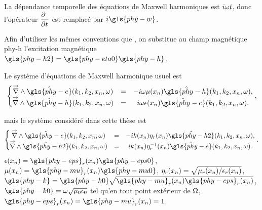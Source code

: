 

La dépendance temporelle des équations de Maxwell harmoniques est \(i\w t\), donc l'opérateur \(\ddr{t}{~}\) est remplacé par \(i\gls{phy-w}\).

Afin d'utiliser les mêmes conventions que \cite{stupfel_implementation_2015}, on substitue au champ magnétique \gls{phy-h} l’excitation magnétique \(\gls{phy-h2} = \gls{phy-eta0} \gls{phy-h}\).

Le système d'équations de Maxwell harmonique usuel est
\begin{equation}
    \left\lbrace
    \begin{matrix}
    \vrot \hat{\gls{phy-e}}(k_1,k_2,x_n,\w)  &=& -i \omega \mu(x_n) \hat{\gls{phy-h}}(k_1,k_2,x_n,\w),
    \\
    \vrot \hat{\gls{phy-h}}(k_1,k_2,x_n,\w)  &=& i \omega \eps(x_n) \hat{\gls{phy-e}}(k_1,k_2,x_n,\w).
    \end{matrix}
    \right.,
    \label{eq:imp_fourier:intro:maxwell_harmonique}
\end{equation}

mais le système considéré dans cette thèse est
\begin{equation}
    \left\lbrace
    \begin{matrix}
    \vrot \hat{\gls{phy-e}}(k_1,k_2,x_n,\w)  &=& -i k(x_n) \eta_r(x_n) \hat{\gls{phy-h2}}(k_1,k_2,x_n,\w),  \\
    \vrot \hat{\gls{phy-h2}}(k_1,k_2,x_n,\w)  &=& i k(x_n) \eta_r^{-1}(x_n) \hat{\gls{phy-e}}(k_1,k_2,x_n,\w).
    \end{matrix}
    \right..
    \label{eq:imp_fourier:intro:maxwell_harmonique:form_cea}
\end{equation}
\(\eps(x_n)=\gls{phy-eps}_r(x_n)\gls{phy-eps0}\), \(\mu(x_n)=\gls{phy-mu}_r(x_n)\gls{phy-mu0}\), \(\eta_r(x_n)=\sqrt{\mu_r(x_n)/\eps_r(x_n)}\), \(\gls{phy-k}=\gls{phy-k0}\sqrt{\gls{phy-mu}_r(x_n)\gls{phy-eps}_r(x_n)}\), \(\gls{phy-k0} = \w\sqrt{\mu_0\eps_0}\) tel qu'en tout point extérieur de \(\OO\), \(\gls{phy-eps}_r(x_n) = \gls{phy-mu}_r(x_n)= 1\).

